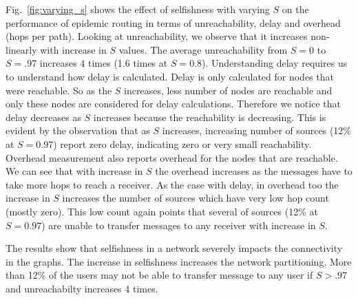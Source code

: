 \documentclass[10pt,conference]{IEEEtran}
\begin{document}
Fig.~\ref{fig:varying_s} shows the effect of selfishness with varying $S$ on the performance of epidemic routing in terms of unreachability, delay and overhead (hops per path). Looking at unreachability, we observe that it increases non-linearly  with increase in $S$ values. The average unreachability from $S=0$  to  $S=.97$ increases 4 times (1.6 times at $S=0.8$). Understanding delay requires us to understand how delay is calculated. Delay is only calculated for nodes that were reachable. So as the $S$ increases, less number of nodes are reachable and only these nodes are considered for delay calculations. Therefore we notice that delay decreases as $S$ increases because the reachability is decreasing. This is evident by the observation that as $S$ increases, increasing number of sources (12\% at $S=0.97$) report zero delay, indicating zero or very small reachability. Overhead measurement also reports overhead for the nodes that are reachable. We can see that with increase in $S$ the overhead increases as the messages have to take  more hops to reach a receiver. As the case with delay, in overhead too the increase in $S$ increases the number of sources which have very low hop count (mostly zero). This low count again points that several of sources (12\% at $S=0.97$) are unable to transfer messages to any receiver with increase in $S$.

The results show that selfishness in a network severely impacts the connectivity in the graphs. The increase in selfishness increases the network partitioning. More than 12\% of the users may not be able to transfer message to any user if $S>.97$ and unreachabilty increases 4 times. 



\begin{figure*}
  \begin{center}
\renewcommand{\thesubfigure}{\Alph{subfigure}.}

    \centering
    

    \caption{Unreachability, Delay  and Overhead at several S and T=0\%, during trace period of Nov 2007}
    \label{fig:varying_s}
  \end{center}
\end{figure*}
\end{document}
